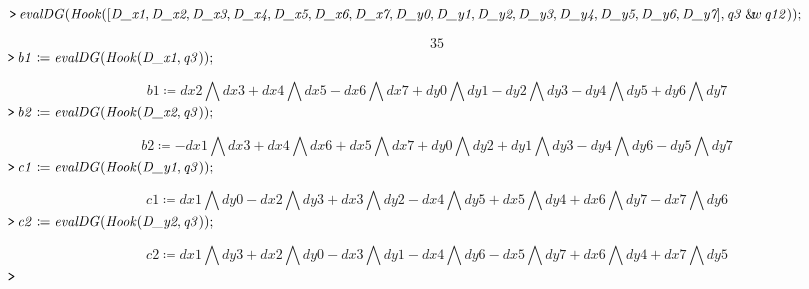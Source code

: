 \documentclass{article}
\begin{document}
\mapleinput
{$ \displaystyle \texttt{>\,} \mathit{evalDG} (\mathit{Hook} ([\textit{D\_x1} ,\textit{D\_x2} ,\textit{D\_x3} ,\textit{D\_x4} ,\textit{D\_x5} ,\textit{D\_x6} ,\textit{D\_x7} ,\textit{D\_y0} ,\textit{D\_y1} ,\textit{D\_y2} ,\textit{D\_y3} ,\textit{D\_y4} ,\textit{D\_y5} ,\textit{D\_y6} ,\textit{D\_y7}],\mathit{q3} \:\&\!\!w \,\mathit{q12})); $}

\begin{dmath}\label{(38)}
35
\end{dmath}
\mapleinput
{$ \displaystyle \texttt{>\,} \mathit{b1} \coloneqq \mathit{evalDG} (\mathit{Hook} (\textit{D\_x1} ,\mathit{q3})); $}

\begin{dmath}\label{(39)}
\mathit{b1} \coloneqq \mathit{dx2} \bigwedge  \mathit{dx3} +\mathit{dx4} \bigwedge  \mathit{dx5} -\mathit{dx6} \bigwedge  \mathit{dx7} +\mathit{dy0} \bigwedge  \mathit{dy1} -\mathit{dy2} \bigwedge  \mathit{dy3} -\mathit{dy4} \bigwedge  \mathit{dy5} +\mathit{dy6} \bigwedge  \mathit{dy7} 
\end{dmath}
\mapleinput
{$ \displaystyle \texttt{>\,} \mathit{b2} \coloneqq \mathit{evalDG} (\mathit{Hook} (\textit{D\_x2} ,\mathit{q3})); $}

\begin{dmath}\label{(40)}
\mathit{b2} \coloneqq -\mathit{dx1} \bigwedge  \mathit{dx3} +\mathit{dx4} \bigwedge  \mathit{dx6} +\mathit{dx5} \bigwedge  \mathit{dx7} +\mathit{dy0} \bigwedge  \mathit{dy2} +\mathit{dy1} \bigwedge  \mathit{dy3} -\mathit{dy4} \bigwedge  \mathit{dy6} -\mathit{dy5} \bigwedge  \mathit{dy7} 
\end{dmath}
\mapleinput
{$ \displaystyle \texttt{>\,} \mathit{c1} \coloneqq \mathit{evalDG} (\mathit{Hook} (\textit{D\_y1} ,\mathit{q3})); $}

\begin{dmath}\label{(41)}
\mathit{c1} \coloneqq \mathit{dx1} \bigwedge  \mathit{dy0} -\mathit{dx2} \bigwedge  \mathit{dy3} +\mathit{dx3} \bigwedge  \mathit{dy2} -\mathit{dx4} \bigwedge  \mathit{dy5} +\mathit{dx5} \bigwedge  \mathit{dy4} +\mathit{dx6} \bigwedge  \mathit{dy7} -\mathit{dx7} \bigwedge  \mathit{dy6} 
\end{dmath}
\mapleinput
{$ \displaystyle \texttt{>\,} \mathit{c2} \coloneqq \mathit{evalDG} (\mathit{Hook} (\textit{D\_y2} ,\mathit{q3})); $}

\begin{dmath}\label{(42)}
\mathit{c2} \coloneqq \mathit{dx1} \bigwedge  \mathit{dy3} +\mathit{dx2} \bigwedge  \mathit{dy0} -\mathit{dx3} \bigwedge  \mathit{dy1} -\mathit{dx4} \bigwedge  \mathit{dy6} -\mathit{dx5} \bigwedge  \mathit{dy7} +\mathit{dx6} \bigwedge  \mathit{dy4} +\mathit{dx7} \bigwedge  \mathit{dy5} 
\end{dmath}
\mapleinput
{$ \displaystyle \texttt{>\,} \, $}
\end{document}

